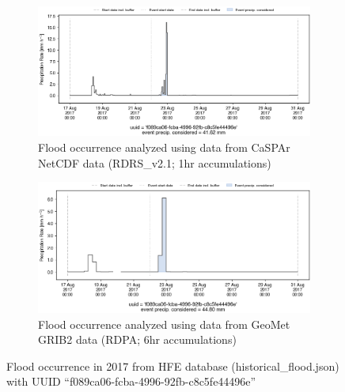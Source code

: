\documentclass[10pt,a4paper,titlepage,parskip]{scrartcl}
\begin{document}
\begin{figure}[h]
	\begin{subfigure}[a]{1.0\textwidth}
		\centering
		\includegraphics[width=\linewidth]{figures/compare_Geomet_CaSPAr/interpolated_at_stations_occurrence_1478_identified-timesteps_RDRS_v2.1.png}
		\caption{Flood occurrence analyzed using data from CaSPAr NetCDF data (RDRS\_v2.1; 1hr accumulations)}
	\end{subfigure}
	\par\bigskip\bigskip
	\begin{subfigure}[b]{1.0\textwidth}
		\centering
		\includegraphics[width=\linewidth]{figures/compare_Geomet_CaSPAr/interpolated_at_stations_occurrence_1478_identified-timesteps_rdpa:10km:6f.png}
		\caption{Flood occurrence analyzed using data from GeoMet GRIB2 data (RDPA; 6hr accumulations)}
	\end{subfigure}
	\par\bigskip\bigskip
	\caption{Flood occurrence in 2017 from HFE database (historical\_flood.json) with UUID ``f089ca06-fcba-4996-92fb-c8c5fe44496e''}
\end{figure}
\pagebreak
\end{document}
